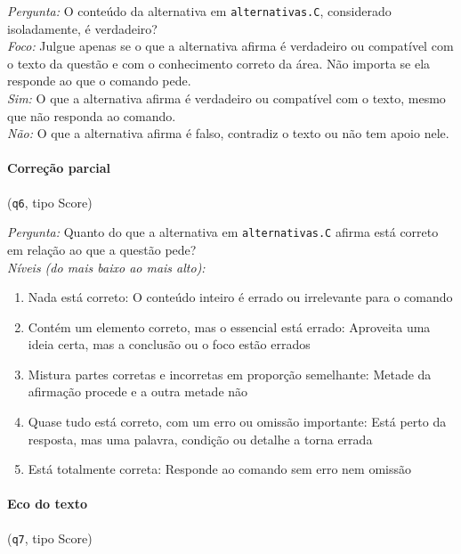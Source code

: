 \textit{Pergunta:} O conteúdo da alternativa em \texttt{alternativas.C}, considerado isoladamente, é verdadeiro?\\
\textit{Foco:} Julgue apenas se o que a alternativa afirma é verdadeiro ou compatível com o texto da questão e com o conhecimento correto da área. Não importa se ela responde ao que o comando pede.\\
\textit{Sim:} O que a alternativa afirma é verdadeiro ou compatível com o texto, mesmo que não responda ao comando.\\
\textit{Não:} O que a alternativa afirma é falso, contradiz o texto ou não tem apoio nele.

\paragraph{Correção parcial} (\texttt{q6}, tipo Score)

\textit{Pergunta:} Quanto do que a alternativa em \texttt{alternativas.C} afirma está correto em relação ao que a questão pede?\\
\textit{Níveis (do mais baixo ao mais alto):}
\begin{enumerate}[nosep,label=\arabic*.,start=0]
  \item Nada está correto: O conteúdo inteiro é errado ou irrelevante para o comando
  \item Contém um elemento correto, mas o essencial está errado: Aproveita uma ideia certa, mas a conclusão ou o foco estão errados
  \item Mistura partes corretas e incorretas em proporção semelhante: Metade da afirmação procede e a outra metade não
  \item Quase tudo está correto, com um erro ou omissão importante: Está perto da resposta, mas uma palavra, condição ou detalhe a torna errada
  \item Está totalmente correta: Responde ao comando sem erro nem omissão
\end{enumerate}

\paragraph{Eco do texto} (\texttt{q7}, tipo Score)

